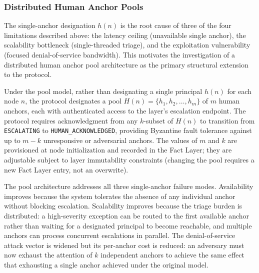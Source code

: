 \subsubsection{Distributed Human Anchor Pools}
\label{sec:fw:anchor-pools}

The single-anchor designation $h(n)$ is the root cause of three of the four limitations described above: the latency ceiling (unavailable single anchor), the scalability bottleneck (single-threaded triage), and the exploitation vulnerability (focused denial-of-service bandwidth). This motivates the investigation of a distributed human anchor pool architecture as the primary structural extension to the protocol.

Under the pool model, rather than designating a single principal $h(n)$ for each node $n$, the protocol designates a pool $H(n) = \{h_1, h_2, \ldots, h_m\}$ of $m$ human anchors, each with authenticated access to the \fact{} layer's escalation endpoint. The protocol requires acknowledgment from any $k$-subset of $H(n)$ to transition from \texttt{ESCALATING} to \texttt{HUMAN\_ACKNOWLEDGED}, providing Byzantine fault tolerance against up to $m - k$ unresponsive or adversarial anchors. The values of $m$ and $k$ are provisioned at node initialization and recorded in the Fact Layer; they are adjustable subject to \fact{} layer immutability constraints (changing the pool requires a new Fact Layer entry, not an overwrite).

The pool architecture addresses all three single-anchor failure modes. Availability improves because the system tolerates the absence of any individual anchor without blocking escalation. Scalability improves because the triage burden is distributed: a high-severity exception can be routed to the first available anchor rather than waiting for a designated principal to become reachable, and multiple anchors can process concurrent escalations in parallel. The denial-of-service attack vector is widened but its per-anchor cost is reduced: an adversary must now exhaust the attention of $k$ independent anchors to achieve the same effect that exhausting a single anchor achieved under the original model.

